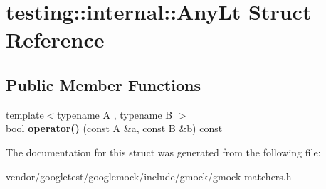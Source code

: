 \hypertarget{structtesting_1_1internal_1_1_any_lt}{}\section{testing\+:\+:internal\+:\+:Any\+Lt Struct Reference}
\label{structtesting_1_1internal_1_1_any_lt}
\subsection*{Public Member Functions}
\begin{DoxyCompactItemize}
\item 
\mbox{\label{structtesting_1_1internal_1_1_any_lt_ac7be54cdf8fd18e12fda49d886eefb56}} 
{\footnotesize template$<$typename A , typename B $>$ }\\bool {\bfseries operator()} (const A \&a, const B \&b) const
\end{DoxyCompactItemize}


The documentation for this struct was generated from the following file\+:\begin{DoxyCompactItemize}
\item 
vendor/googletest/googlemock/include/gmock/gmock-\/matchers.\+h\end{DoxyCompactItemize}
